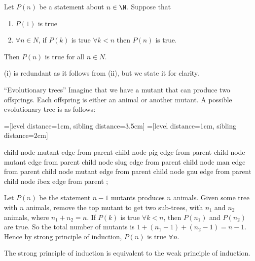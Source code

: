 \documentclass[a4paper]{article}
\begin{document}
  \begin{thm}
    Let $P(n)$ be a statement about $n\in \N$. Suppose that
    \begin{enumerate}
      \item $P(1)$ is true
      \item $\forall n\in N$, if $P(k)$ is true $\forall k < n$ then $P(n)$ is true. 
    \end{enumerate}
    Then $P(n)$ is true for all $n\in N$.
  \end{thm}
  \note (i) is redundant as it follows from (ii), but we state it for clarity.

  \begin{eg}
    ``Evolutionary trees'' Imagine that we have a mutant that can produce two offsprings. Each offspring is either an animal or another mutant. A possible evolutionary tree is as follows:

    =[level distance=1cm, sibling distance=3.5cm]
    =[level distance=1cm, sibling distance=2cm]

    \begin{center}
      \begin{tikz}
        child {
          node {mutant} edge from parent
          child {
            node {pig} edge from parent
          }
          child {
            node {mutant} edge from parent
            child {
              node {slug} edge from parent
            }
            child {
              node {man} edge from parent
            }
          }
        }
        child {
          node {mutant} edge from parent
          child {
            node {gnu} edge from parent
          }
          child {
            node {ibex} edge from parent
          }
        };
      \end{tikz}
    \end{center}

    Let $P(n)$ be the statement $n - 1$ mutants produces $n$ animals. Given some tree with $n$ animals, remove the top mutant to get two sub-trees, with $n_1$ and $n_2$ animals, where $n_1 + n_2 = n$. If $P(k)$ is true $\forall k < n$, then $P(n_1)$ and $P(n_2)$ are true. So the total number of mutants is $1 + (n_1 - 1) + (n_2 - 1) = n - 1$. Hence by strong principle of induction, $P(n)$ is true $\forall n$.
  \end{eg}

  \begin{thm}
    The strong principle of induction is equivalent to the weak principle of induction.
  \end{thm}
\end{document}
